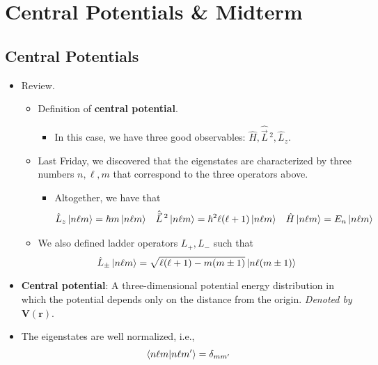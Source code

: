 \documentclass[../notes.tex]{subfiles}
\begin{document}
\chapter{Central Potentials \& Midterm}
\section{Central Potentials}
\begin{itemize}
    \item {}Review.
    \begin{itemize}
        \item Definition of \textbf{central potential}.
        \begin{itemize}
            \item In this case, we have three good observables: $\hat{H},\hat{\vec{L}}{\,}^2,\hat{L}_z$.
        \end{itemize}
        \item Last Friday, we discovered that the eigenstates are characterized by three numbers $n,\ell,m$ that correspond to the three operators above.
        \begin{itemize}
            \item Altogether, we have that
            \begin{align*}
                \hat{L}_z\ket{n\ell m} &= \hbar m\ket{n\ell m}&
                \hat{\vec{L}}{\,}^2\ket{n\ell m} &= \hbar^2\ell(\ell+1)\ket{n\ell m}&
                \hat{H}\ket{n\ell m} &= E_n\ket{n\ell m}
            \end{align*}
        \end{itemize}
        \item We also defined ladder operators $L_+,L_-$ such that
        \begin{equation*}
            \hat{L}_\pm\ket{n\ell m} = \sqrt{\ell(\ell+1)-m(m\pm 1)}\ket{n\ell(m\pm 1)}
        \end{equation*}
    \end{itemize}
    \item \textbf{Central potential}: A three-dimensional potential energy distribution in which the potential depends only on the distance from the origin. \emph{Denoted by} $\bm{V(r)}$.
    \item The eigenstates are well normalized, i.e.,
    \begin{equation*}
        \braket{n\ell m}{n\ell m'} = \delta_{mm'}
    \end{equation*}
    \begin{itemize}

\end{itemize}
\end{itemize}
\end{document}

